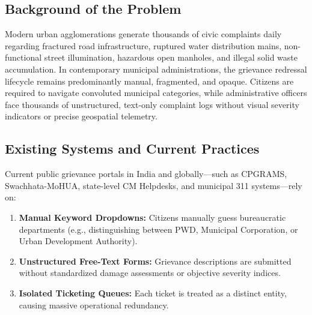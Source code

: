 \documentclass[11pt,a4paper]{article}
\begin{document}
\subsection{Background of the Problem}
Modern urban agglomerations generate thousands of civic complaints daily regarding fractured road infrastructure, ruptured water distribution mains, non-functional street illumination, hazardous open manholes, and illegal solid waste accumulation. In contemporary municipal administrations, the grievance redressal lifecycle remains predominantly manual, fragmented, and opaque. Citizens are required to navigate convoluted municipal categories, while administrative officers face thousands of unstructured, text-only complaint logs without visual severity indicators or precise geospatial telemetry.

\subsection{Existing Systems and Current Practices}
Current public grievance portals in India and globally---such as CPGRAMS, Swachhata-MoHUA, state-level CM Helpdesks, and municipal 311 systems---rely on:
\begin{enumerate}[leftmargin=1.5em]
    \item \textbf{Manual Keyword Dropdowns:} Citizens manually guess bureaucratic departments (e.g., distinguishing between PWD, Municipal Corporation, or Urban Development Authority).
    \item \textbf{Unstructured Free-Text Forms:} Grievance descriptions are submitted without standardized damage assessments or objective severity indices.
    \item \textbf{Isolated Ticketing Queues:} Each ticket is treated as a distinct entity, causing massive operational redundancy.
\end{enumerate}
\end{document}
